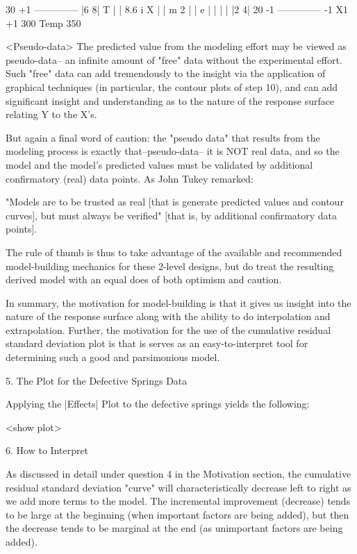     30 +1 --------------
          |6          8|
     T    |            |   8.6
     i  X |            |
     m  2 |            |
     e    |            |
          |            |
          |2          4|
    20 -1 --------------
          -1    X1    +1
          300  Temp  350

<Pseudo-data>
The predicted value from the modeling effort may
be viewed as pseudo-data-- an infinite amount of
"free" data without the experimental effort.  Such
"free" data can add tremendously to the insight
via the application of graphical techniques (in
particular, the contour plots of step 10), and can
add significant insight and understanding as to
the nature of the response surface relating Y to
the X's.

But again a final word of caution: the "pseudo
data" that results from the modeling process is
exactly that--pseudo-data-- it is NOT real data,
and so the model and the model's predicted values
must be validated by additional confirmatory
(real) data points.  As John Tukey remarked:

   "Models are to be trusted as real [that is
   generate predicted values and contour curves],
   but must always be verified" [that is, by
   additional confirmatory data points].

The rule of thumb is thus to take advantage of the
available and recommended model-building mechanics
for these 2-level designs, but do treat the
resulting derived model with an equal does of both
optimism and caution.

In summary, the motivation for model-building is
that it gives us insight into the nature of the
response surface along with the ability to do
interpolation and extrapolation.  Further, the
motivation for the use of the cumulative residual
standard deviation plot is that is serves as an
easy-to-interpret tool for determining such a good
and parsimonious model.

5. The Plot for the Defective Springs Data

Applying the |Effects| Plot to the defective
springs yields the following:

   <show plot>

6. How to Interpret

As discussed in detail under question 4 in the
Motivation section, the cumulative residual
standard deviation "curve" will characteristically
decrease left to right as we add more terms to the
model.  The incremental improvement (decrease)
tends to be large at the beginning (when important
factors are being added), but then the decrease
tends to be marginal at the end (as unimportant
factors are being added).

